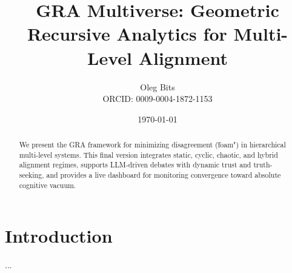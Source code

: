 \documentclass{article}
\title{GRA Multiverse: Geometric Recursive Analytics for Multi-Level Alignment}
\author{Oleg Bits \\ ORCID: 0009-0004-1872-1153}
\date{\today}
\begin{document}
\maketitle
\begin{abstract}
We present the GRA framework for minimizing disagreement (\"foam") in hierarchical multi-level systems. 
This final version integrates static, cyclic, chaotic, and hybrid alignment regimes, supports LLM-driven debates with dynamic trust and truth-seeking, and provides a live dashboard for monitoring convergence toward absolute cognitive vacuum.
\end{abstract}
\section{Introduction}
...
\end{document}

